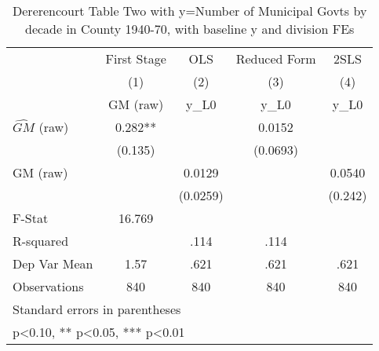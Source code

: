 \begin{table}[htbp]\centering
\def\sym#1{\ifmmode^{#1}\else\(^{#1}\)\fi}
\caption{Dererencourt Table Two with y=Number of Municipal Govts by decade in County 1940-70, with baseline y and division FEs}
\begin{tabular}{l*{4}{c}}
\toprule
                    & First Stage   &         OLS   &Reduced Form   &        2SLS   \\
                    &\multicolumn{1}{c}{(1)}&\multicolumn{1}{c}{(2)}&\multicolumn{1}{c}{(3)}&\multicolumn{1}{c}{(4)}\\
                    &\multicolumn{1}{c}{GM  (raw)}&\multicolumn{1}{c}{y\_L0}&\multicolumn{1}{c}{y\_L0}&\multicolumn{1}{c}{y\_L0}\\
\midrule
$\hat{GM}$ (raw)    &       0.282** &               &      0.0152   &               \\
                    &     (0.135)   &               &    (0.0693)   &               \\
\addlinespace
GM  (raw)           &               &      0.0129   &               &      0.0540   \\
                    &               &    (0.0259)   &               &     (0.242)   \\
\midrule
F-Stat              &      16.769   &               &               &               \\
R-squared           &               &        .114   &        .114   &               \\
Dep Var Mean        &        1.57   &        .621   &        .621   &        .621   \\
Observations        &         840   &         840   &         840   &         840   \\
\bottomrule
\multicolumn{5}{l}{\footnotesize Standard errors in parentheses}\\
\multicolumn{5}{l}{\footnotesize * p<0.10, ** p<0.05, *** p<0.01}\\
\end{tabular}
\end{table}
